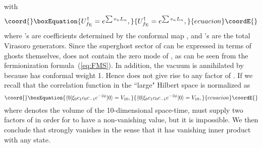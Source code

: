 \documentclass[a4paper,12pt]{article}
\providecommand{\cA}{\mathcal{A}}
\providecommand{\aaru}{\mathbf{R}}
\begin{document}
with
\begin{equation}\coord{}\boxEquation{
U^{\dagger}_{f_{\Sigma}}=e^{\sum v_n L_n}, \label{eq:XB}
}{
U^{\dagger}_{f_{\Sigma}}=e^{\sum v_n L_n}, }{ecuacion}\coordE{}\end{equation}
where \coordHE{}'s are coefficients determined by the conformal map \coordHE{}, and 
\coordHE{}'s are the total Virasoro generators. Since the superghost sector of \coordHE{} 
can be expressed in terms of \myHighlight{$\beta\gamma$}\coordHE{} ghosts themselves, \coordHE{} does not contain 
the zero mode of \myHighlight{$\xi$}\coordHE{}, as can be seen from the fermionization formula~(\ref{eq:FMS}). 
In addition, the \myHighlight{$SL(2,\aaru)$}\coordHE{} vacuum \myHighlight{$|0\rangle$}\coordHE{} is annihilated by \coordHE{} because \myHighlight{$\eta$}\coordHE{} 
has conformal weight 1. Hence \myHighlight{$|\Sigma\rangle$}\coordHE{} does not give rise to any factor of \coordHE{}. 
If we recall that the correlation function in the ``large" Hilbert space is normalized as 
\begin{equation}\coord{}\boxEquation{
\langle 0|\xi_0 c_1c_0c_{-1}e^{-2\phi}|0\rangle=V_{10}, 
}{
\langle 0|\xi_0 c_1c_0c_{-1}e^{-2\phi}|0\rangle=V_{10}, 
}{ecuacion}\coordE{}\end{equation}
where \coordHE{} denotes the volume of the 10-dimensional space-time, \myHighlight{$|\cA\rangle$}\coordHE{} must 
supply two factors of \coordHE{} in order for \myHighlight{$\langle\Sigma|\eta_0|\cA\rangle$}\coordHE{} to have 
a non-vanishing value, but it is impossible. We then conclude that \coordHE{} strongly 
vanishes in the sense that it has vanishing inner product with any state. 
\end{document}
